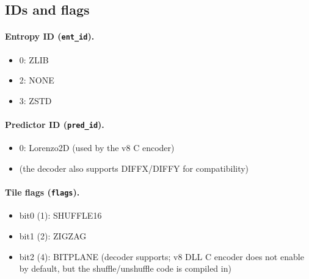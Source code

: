 \documentclass[11pt,a4paper]{article}
\begin{document}
\subsection{IDs and flags}
\paragraph{Entropy ID (\texttt{ent\_id}).}
\begin{itemize}
  \item 0: ZLIB
  \item 2: NONE
  \item 3: ZSTD
\end{itemize}

\paragraph{Predictor ID (\texttt{pred\_id}).}
\begin{itemize}
  \item 0: Lorenzo2D (used by the v8 C encoder)
  \item (the decoder also supports DIFFX/DIFFY for compatibility)
\end{itemize}

\paragraph{Tile flags (\texttt{flags}).}
\begin{itemize}
  \item bit0 (1): SHUFFLE16
  \item bit1 (2): ZIGZAG
  \item bit2 (4): BITPLANE (decoder supports; v8 DLL C encoder does not enable by default, but the shuffle/unshuffle code is compiled in)
\end{itemize}
\end{document}

